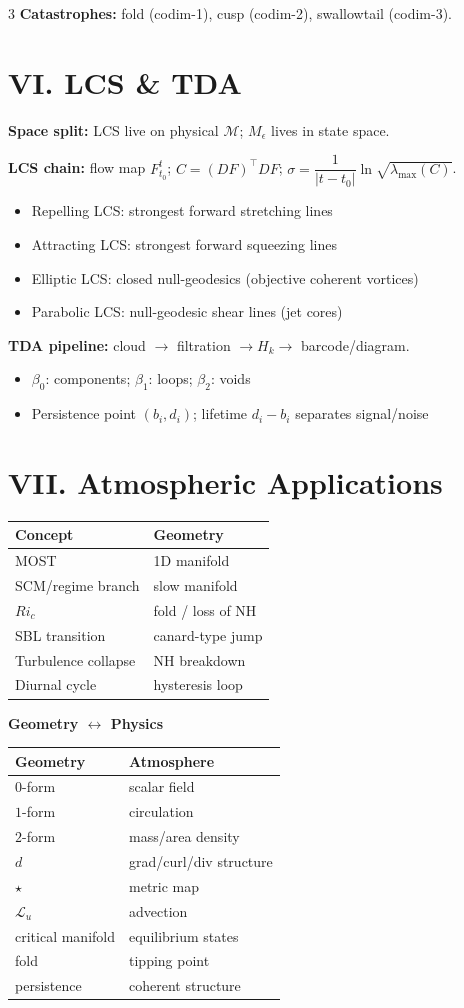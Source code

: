 \documentclass[9pt,letterpaper]{extarticle}
\newcommand{\sect}[1]{\section*{#1}}
\newcommand{\T}[1]{\textbf{#1}}
\begin{document}
\begin{multicols}{3}
\T{Catastrophes:} fold (codim-1), cusp (codim-2), swallowtail (codim-3).

\sect{VI. LCS \& TDA}
\T{Space split:} LCS live on physical $\mathcal{M}$; $M_\epsilon$ lives in state space.

\T{LCS chain:} flow map $F_{t_0}^t$; $C=(DF)^\top DF$; $\sigma=\dfrac{1}{|t-t_0|}\ln\sqrt{\lambda_{\max}(C)}$.

\begin{itemize}
  \item Repelling LCS: strongest forward stretching lines
  \item Attracting LCS: strongest forward squeezing lines
  \item Elliptic LCS: closed null-geodesics (objective coherent vortices)
  \item Parabolic LCS: null-geodesic shear lines (jet cores)
\end{itemize}

\T{TDA pipeline:} cloud $\to$ filtration $\to H_k \to$ barcode/diagram.
\begin{itemize}
  \item $\beta_0$: components; $\beta_1$: loops; $\beta_2$: voids
  \item Persistence point $(b_i,d_i)$; lifetime $d_i-b_i$ separates signal/noise
\end{itemize}

\sect{VII. Atmospheric Applications}
\begin{tabular}{@{}ll@{}}
\toprule
Concept & Geometry \\
\midrule
MOST & 1D manifold \\
SCM/regime branch & slow manifold \\
$Ri_c$ & fold / loss of NH \\
SBL transition & canard-type jump \\
Turbulence collapse & NH breakdown \\
Diurnal cycle & hysteresis loop \\
\bottomrule
\end{tabular}

\vspace{2pt}
\T{Geometry $\leftrightarrow$ Physics}\\[-1pt]
\begin{tabular}{@{}ll@{}}
\toprule
Geometry & Atmosphere \\
\midrule
$0$-form & scalar field \\
$1$-form & circulation \\
$2$-form & mass/area density \\
$d$ & grad/curl/div structure \\
$\star$ & metric map \\
$\mathcal{L}_u$ & advection \\
critical manifold & equilibrium states \\
fold & tipping point \\
persistence & coherent structure \\
\bottomrule
\end{tabular}


\end{multicols}
\end{document}
